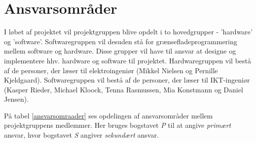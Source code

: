 \newpage
\section{Ansvarsområder}
I løbet af projektet vil projektgruppen blive opdelt i to hovedgrupper - 'hardware' og 'software'. Softwaregruppen vil desuden stå for grænsefladeprogrammering mellem software og hardware. Disse grupper vil have til ansvar at designe og implementere hhv. hardware og software til projektet. Hardwaregruppen vil bestå af de personer, der læser til elektroingeniør (Mikkel Nielsen og Pernille Kjeldgaard). Softwaregruppen vil bestå af de personer, der læser til IKT-ingeniør (Kasper Rieder, Michael Kloock, Tenna Rasmussen, Mia Konstmann og Daniel Jensen).

På tabel \ref{ansvarsomraader} ses opdelingen af ansvarsområder mellem projektgruppens medlemmer. Her bruges bogstavet \textit{P} til at angive \textit{primært} ansvar, hvor bogstavet \textit{S} angiver \textit{sekundært} ansvar.

